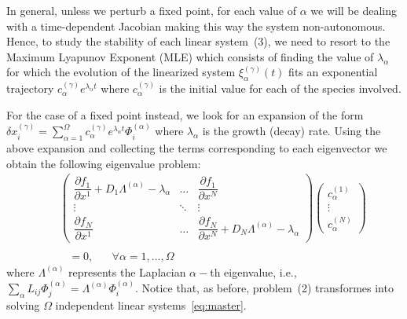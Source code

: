 \documentclass[prx,twocolumn,amsmath,noshowkeys,noshowpacs,amssymb]{revtex4-2}
\begin{document}
{In general, unless we perturb a fixed point, for each value of $\alpha$ we will be dealing with a time-dependent Jacobian making this way the system non-autonomous. Hence, to study the stability of each linear system~(3), we need to resort to the Maximum Lyapunov Exponent (MLE) which consists of finding the value of $\lambda_{\alpha}$ for which the evolution of the linearized system $\xi_{\alpha}^{(\gamma)}(t)$ fits an exponential trajectory $c_{\alpha}^{(\gamma)}e^{\lambda_{\alpha}t}$ where $c_{\alpha}^{(\gamma)}$ is the initial value for each of the species involved.}

{For the case of a fixed point instead, we look for an expansion of} the form $\delta x_i^{(\gamma)}=\sum_{\alpha=1}^{\Omega} c_{\alpha}^{(\gamma)}e^{\lambda_{\alpha}t}\Phi_i^{(\alpha)}$ where $\lambda_{\alpha}$ is the growth (decay) rate. Using the above expansion and collecting the terms corresponding to each eigenvector we obtain the following eigenvalue problem:
\begin{eqnarray}
&&\!\begin{pmatrix}
\dfrac{\partial f_1}{\partial x^1} + D_1\Lambda^{(\alpha)} - \lambda_{\alpha} & \dots  & \dfrac{\partial f_{1}}{\partial x^{N}}\\ \vdots &  \ddots &  \vdots\\ \dfrac{\partial f_{N}}{\partial x^1} & \dots  & \dfrac{\partial f_N}{\partial x^{N}}+ D_N\Lambda^{(\alpha)} - \lambda_{\alpha}
\end{pmatrix}\!\!\! \begin{pmatrix}
c_{\alpha}^{(1)}\\\vdots\\c_{\alpha}^{(N)}
\end{pmatrix}\!\!\nonumber\\\nonumber \\ && \,\,\,\,\,=0, \,\,\,\,\,\,\,\,\,\,\forall \alpha=1,\dots,\Omega
\label{eq:master}
\end{eqnarray}
where $\Lambda^{(\alpha)}$ represents the Laplacian $\alpha-$th eigenvalue, i.e., $\sum_{\alpha} L_{ij} \Phi_j^{(\alpha)}=\Lambda^{(\alpha)}\Phi_i^{(\alpha)}$. {Notice that, as before, problem~(2) transformes into solving  $\Omega$ independent linear systems~\eqref{eq:master}.}%
\end{document}
